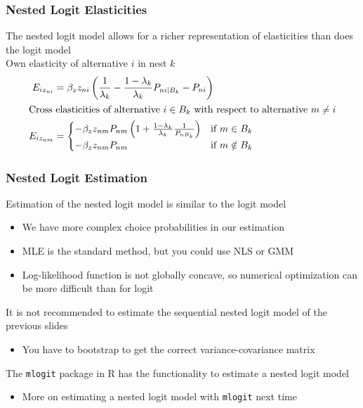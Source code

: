\documentclass{beamer}
\begin{document}
\begin{frame}\frametitle{Nested Logit Elasticities}
    The nested logit model allows for a richer representation of elasticities than does the logit model \\
    \vspace{2ex}
    Own elasticity of alternative $i$ in nest $k$
    \begin{align*}
    	E_{iz_{ni}} &= \beta_z z_{ni} \left( \frac{1}{\lambda_k} - \frac{1 - \lambda_k}{\lambda_k} P_{ni \mid B_k} - P_{ni} \right) \\
    	\intertext{Cross elasticities of alternative $i \in B_k$ with respect to alternative $m \neq i$}
    	E_{iz_{nm}} &= 
    	\begin{cases}
    		-\beta_z z_{nm} P_{nm} \left( 1 + \frac{1 - \lambda_k}{\lambda_k} \frac{1}{P_{nB_k}} \right) &\text{if } m \in B_k \\
    		-\beta_z z_{nm} P_{nm} &\text{if } m \notin B_k
  		\end{cases}
    \end{align*}
\end{frame}

\begin{frame}\frametitle{Nested Logit Estimation}
	Estimation of the nested logit model is similar to the logit model
	\begin{itemize}
		\item We have more complex choice probabilities in our estimation
		\item MLE is the standard method, but you could use NLS or GMM
		\item Log-likelihood function is not globally concave, so numerical optimization can be more difficult than for logit
	\end{itemize}
	\vspace{2ex}
	It is not recommended to estimate the sequential nested logit model of the previous slides
	\begin{itemize}
		\item You have to bootstrap to get the correct variance-covariance matrix
	\end{itemize}
	\vspace{2ex}
	The \texttt{mlogit} package in R has the functionality to estimate a nested logit model
	\begin{itemize}
		\item More on estimating a nested logit model with \texttt{mlogit} next time
	\end{itemize}
\end{frame}
\end{document}
